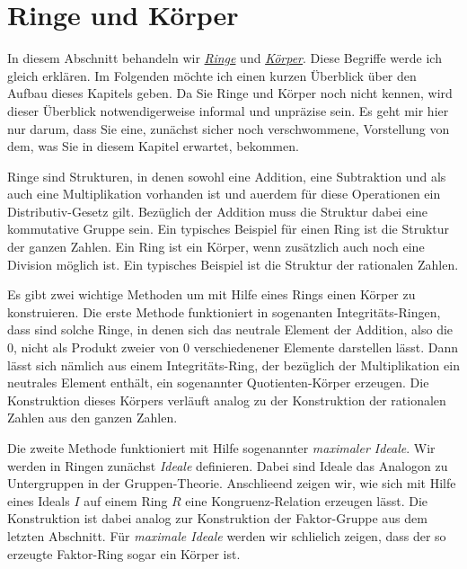 \chapter{Ringe und K\"{o}rper}
In diesem Abschnitt behandeln wir 
\href{http://de.wikipedia.org/wiki/Ring_(Algebra)}{\emph{Ringe}} und 
\href{http://en.wikipedia.org/wiki/Field_(mathematics)}{\emph{K\"{o}rper}}.  Diese Begriffe werde ich gleich erkl\"{a}ren.
Im Folgenden m\"{o}chte ich einen kurzen \"{U}berblick \"{u}ber den Aufbau dieses Kapitels geben.  Da Sie Ringe und
K\"{o}rper  noch nicht kennen, wird dieser \"{U}berblick notwendigerweise informal und
unpr\"{a}zise sein.  Es geht mir hier nur darum, dass Sie eine, zun\"{a}chst sicher noch verschwommene, Vorstellung
von dem, was Sie in diesem Kapitel erwartet, bekommen.

Ringe sind Strukturen, in denen
sowohl eine Addition, eine Subtraktion und als auch eine Multiplikation vorhanden ist und au\3erdem f\"{u}r diese
Operationen ein Distributiv-Gesetz gilt.  Bez\"{u}glich der Addition muss die Struktur dabei eine kommutative
Gruppe sein. Ein typisches Beispiel f\"{u}r einen Ring ist die Struktur der ganzen
Zahlen. Ein Ring ist ein K\"{o}rper, wenn zus\"{a}tzlich auch noch eine Division m\"{o}glich ist.
Ein typisches Beispiel ist die Struktur der rationalen Zahlen.

Es gibt zwei wichtige Methoden um mit Hilfe eines Rings einen K\"{o}rper zu konstruieren.
Die erste Methode funktioniert in sogenanten Integrit\"{a}ts-Ringen, dass sind solche Ringe, in denen sich 
das neutrale Element der Addition, also die $0$, nicht als Produkt zweier von $0$ verschiedenener Elemente 
darstellen l\"{a}sst.  Dann l\"{a}sst sich n\"{a}mlich aus einem Integrit\"{a}ts-Ring, der bez\"{u}glich der
Multiplikation ein 
neutrales Element enth\"{a}lt, ein sogenannter Quotienten-K\"{o}rper erzeugen.  Die Konstruktion dieses K\"{o}rpers
verl\"{a}uft analog zu der Konstruktion der rationalen Zahlen aus den ganzen Zahlen.

Die zweite Methode funktioniert mit Hilfe sogenannter \emph{maximaler Ideale}.  Wir werden in Ringen zun\"{a}chst
\emph{Ideale} definieren.  Dabei sind Ideale das Analogon zu Untergruppen in der Gruppen-Theorie.
Anschlie\3end zeigen wir, wie sich mit Hilfe eines Ideals $I$ auf einem Ring $R$ eine Kongruenz-Relation
erzeugen l\"{a}sst.  Die Konstruktion ist dabei analog zur Konstruktion der
Faktor-Gruppe aus dem letzten Abschnitt.  F\"{u}r \emph{maximale Ideale} werden wir schlie\3lich zeigen,
dass der so erzeugte Faktor-Ring sogar ein K\"{o}rper ist.

